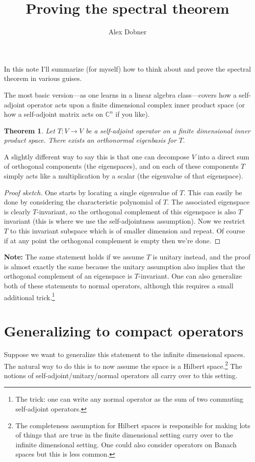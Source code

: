 \documentclass[a4paper,11pt,twoside]{amsart}
\newcommand{\C}{\mathbb{C}}
\newtheorem*{theorem}{Theorem}
\theoremstyle{definition}
\begin{document}
\title{Proving the spectral theorem}
\author{Alex Dobner}
\address{Department of Mathematics, University of Michigan \\
530 Church St\\
Ann Arbor, MI 48109}
\maketitle

In this note I'll summarize (for myself) how to think about and prove the spectral theorem in various guises.

The most basic version---as one learns in a linear algebra class---covers how a self-adjoint operator acts upon a finite dimensional complex inner product space (or how a self-adjoint matrix acts on $\C^n$ if you like).
\begin{theorem}
Let $T \colon V \to V$ be a self-adjoint operator on a finite dimensional inner product space. There exists an orthonormal eigenbasis for $T$.
\end{theorem}

A slightly different way to say this is that one can decompose $V$ into a direct sum of orthogonal components (the eigenspaces), and on each of these components $T$ simply acts like a multiplication by a scalar (the eigenvalue of that eigenspace).

\begin{proof}[Proof sketch]
One starts by locating a single eigenvalue of $T$. This can easily be done by considering the characteristic polynomial of $T$. The associated eigenspace is clearly $T$-invariant, so the orthogonal complement of this eigenspace is also $T$ invariant (this is where we use the self-adjointness assumption). Now we restrict $T$ to this invariant subspace which is of smaller dimension and repeat. Of course if at any point the orthogonal complement is empty then we're done.
\end{proof}

\textbf{Note:} The same statement holds if we assume $T$ is unitary instead, and the proof is almost exactly the same because the unitary assumption also implies that the orthogonal complement of an eigenspace is $T$-invariant. One can also generalize both of these statements to normal operators, although this requires a small additional trick.\footnote{The trick: one can write any normal operator as the sum of two commuting self-adjoint operators.}

\section{Generalizing to compact operators}
Suppose we want to generalize this statement to the infinite dimensional spaces. The natural way to do this is to now assume the space is a Hilbert space.\footnote{The completeness assumption for Hilbert spaces is responsible for making lots of things that are true in the finite dimensional setting carry over to the infinite dimensional setting. One could also consider operators on Banach spaces but this is less common.} The notions of self-adjoint/unitary/normal operators all carry over to this setting.
\end{document}
